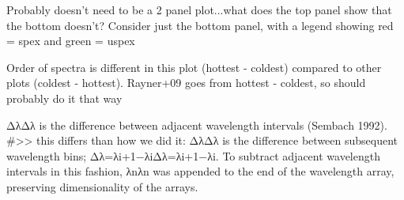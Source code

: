 Probably doesn’t need to be a 2 panel plot...what does the top panel show that the bottom doesn’t? Consider just the bottom panel, with a legend showing red = spex and green = uspex


Order of spectra is different in this plot (hottest - coldest) compared to other plots (coldest - hottest). Rayner+09 goes from hottest - coldest, so should probably do it that way


ΔλΔλ is the difference between adjacent wavelength intervals (Sembach 1992). 
#>> this differs than how we did it: ΔλΔλ is the difference between subsequent wavelength bins; Δλ=λi+1−λiΔλ=λi+1−λi. To subtract adjacent wavelength intervals in this fashion, λnλn was appended to the end of the wavelength array, preserving dimensionality of the arrays.
